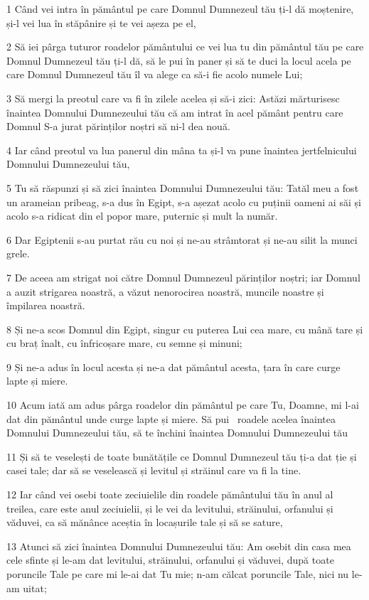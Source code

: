 \par 1 Când vei intra în pământul pe care Domnul Dumnezeul tău ți-l dă moștenire, și-l vei lua în stăpânire și te vei așeza pe el,
\par 2 Să iei pârga tuturor roadelor pământului ce vei lua tu din pământul tău pe care Domnul Dumnezeul tău ți-l dă, să le pui în paner și să te duci la locul acela pe care Domnul Dumnezeul tău îl va alege ca să-i fie acolo numele Lui;
\par 3 Să mergi la preotul care va fi în zilele acelea și să-i zici: Astăzi mărturisesc înaintea Domnului Dumnezeului tău că am intrat în acel pământ pentru care Domnul S-a jurat părinților noștri să ni-l dea nouă.
\par 4 Iar când preotul va lua panerul din mâna ta și-l va pune înaintea jertfelnicului Domnului Dumnezeului tău,
\par 5 Tu să răspunzi și să zici înaintea Domnului Dumnezeului tău: Tatăl meu a fost un arameian pribeag, s-a dus în Egipt, s-a așezat acolo cu puținii oameni ai săi și acolo s-a ridicat din el popor mare, puternic și mult la număr.
\par 6 Dar Egiptenii s-au purtat rău cu noi și ne-au strâmtorat și ne-au silit la munci grele.
\par 7 De aceea am strigat noi către Domnul Dumnezeul părinților noștri; iar Domnul a auzit strigarea noastră, a văzut nenorocirea noastră, muncile noastre și împilarea noastră.
\par 8 Și ne-a scos Domnul din Egipt, singur cu puterea Lui cea mare, cu mână tare și cu braț înalt, cu înfricoșare mare, cu semne și minuni;
\par 9 Și ne-a adus în locul acesta și ne-a dat pământul acesta, țara în care curge lapte și miere.
\par 10 Acum iată am adus pârga roadelor din pământul pe care Tu, Doamne, mi l-ai dat din pământul unde curge lapte și miere. Să pui  roadele acelea înaintea Domnului Dumnezeului tău, să te închini înaintea Domnului Dumnezeului tău
\par 11 Și să te veselești de toate bunătățile ce Domnul Dumnezeul tău ți-a dat ție și casei tale; dar să se veselească și levitul și străinul care va fi la tine.
\par 12 Iar când vei osebi toate zeciuielile din roadele pământului tău în anul al treilea, care este anul zeciuielii, și le vei da levitului, străinului, orfanului și văduvei, ca să mănânce aceștia în locașurile tale și să se sature,
\par 13 Atunci să zici înaintea Domnului Dumnezeului tău: Am osebit din casa mea cele sfinte și le-am dat levitului, străinului, orfanului și văduvei, după toate poruncile Tale pe care mi le-ai dat Tu mie; n-am călcat poruncile Tale, nici nu le-am uitat;
